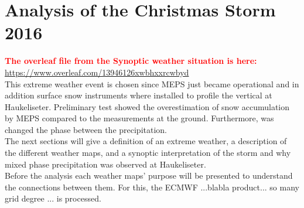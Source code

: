 \chapter{Analysis of the Christmas Storm 2016}
\textcolor{red}{\textbf{The overleaf file from the Synoptic weather situation is here:} \\
	\url{https://www.overleaf.com/13946126xwbhxxrcwbyd}}
\\
This extreme weather event is chosen since MEPS just became operational and in addition surface snow instruments where installed to profile the vertical at Haukeliseter. Preliminary test showed the overestimation of snow accumulation by MEPS compared to the measurements at the ground. Furthermore, was changed the phase between the precipitation.  
\\
The next sections will give a definition of an extreme weather, a description of the different weather maps, and a synoptic interpretation of the storm and why mixed phase precipitation was observed at Haukeliseter. \\
Before the analysis each weather maps' purpose  will be presented to understand the connections between them. For this, the ECMWF ...blabla product... so many grid degree ...  is processed.
\\



\newpage









\newpage





